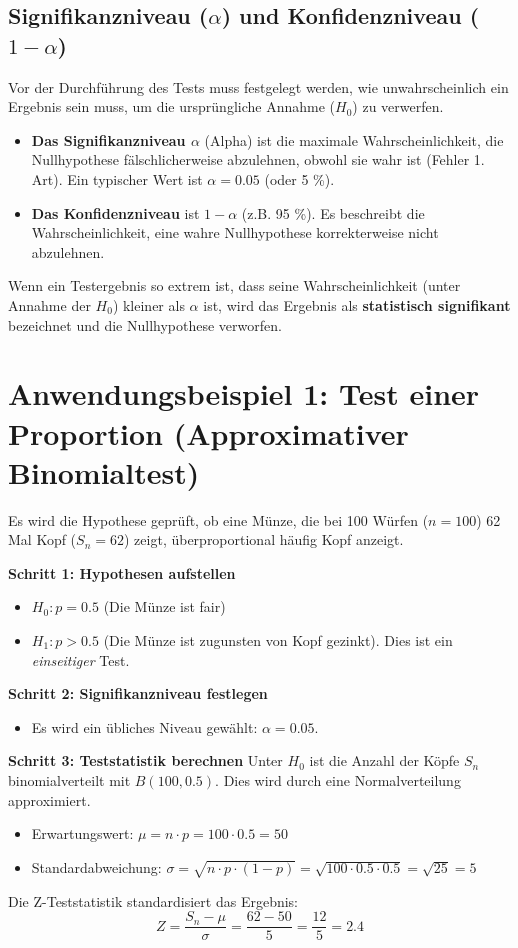 \subsection{Signifikanzniveau ($\alpha$) und Konfidenzniveau ($1-\alpha$)}
Vor der Durchführung des Tests muss festgelegt werden, wie unwahrscheinlich ein Ergebnis sein muss, um die ursprüngliche Annahme ($H_0$) zu verwerfen.
\begin{itemize}
    \item \textbf{Das Signifikanzniveau $\alpha$} (Alpha) ist die maximale Wahrscheinlichkeit, die Nullhypothese fälschlicherweise abzulehnen, obwohl sie wahr ist (Fehler 1. Art). Ein typischer Wert ist $\alpha = 0.05$ (oder 5 \%).
    \item \textbf{Das Konfidenzniveau} ist $1-\alpha$ (z.B. 95 \%). Es beschreibt die Wahrscheinlichkeit, eine wahre Nullhypothese korrekterweise nicht abzulehnen.
\end{itemize}
Wenn ein Testergebnis so extrem ist, dass seine Wahrscheinlichkeit (unter Annahme der $H_0$) kleiner als $\alpha$ ist, wird das Ergebnis als \textbf{statistisch signifikant} bezeichnet und die Nullhypothese verworfen.

\section{Anwendungsbeispiel 1: Test einer Proportion (Approximativer Binomialtest)}

Es wird die Hypothese geprüft, ob eine Münze, die bei 100 Würfen ($n=100$) 62 Mal Kopf ($S_n = 62$) zeigt, überproportional häufig Kopf anzeigt.

\textbf{Schritt 1: Hypothesen aufstellen}
\begin{itemize}
    \item $H_0: p = 0.5$ (Die Münze ist fair)
    \item $H_1: p > 0.5$ (Die Münze ist zugunsten von Kopf gezinkt). Dies ist ein \textit{einseitiger} Test.
\end{itemize}

\textbf{Schritt 2: Signifikanzniveau festlegen}
\begin{itemize}
    \item Es wird ein übliches Niveau gewählt: $\alpha = 0.05$.
\end{itemize}

\textbf{Schritt 3: Teststatistik berechnen}
Unter $H_0$ ist die Anzahl der Köpfe $S_n$ binomialverteilt mit $B(100, 0.5)$. Dies wird durch eine Normalverteilung approximiert.
\begin{itemize}
    \item Erwartungswert: $\mu = n \cdot p = 100 \cdot 0.5 = 50$
    \item Standardabweichung: $\sigma = \sqrt{n \cdot p \cdot (1-p)} = \sqrt{100 \cdot 0.5 \cdot 0.5} = \sqrt{25} = 5$
\end{itemize}
Die Z-Teststatistik standardisiert das Ergebnis:
$$Z = \frac{S_n - \mu}{\sigma} = \frac{62 - 50}{5} = \frac{12}{5} = 2.4$$

